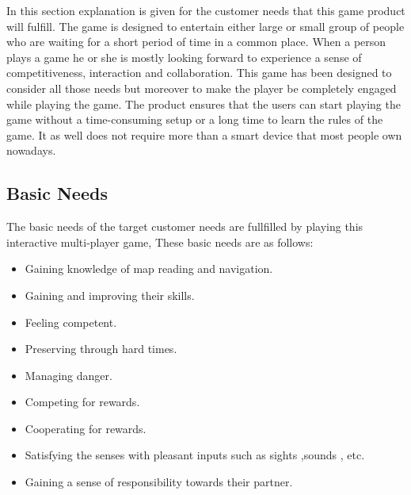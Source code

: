 

In this section explanation is given for the customer needs that this game product will fulfill. The game is designed to entertain either large or small group of people who are waiting for a short period of time in a common place. When a person plays a game he or she is mostly looking forward to experience a sense of competitiveness, interaction and collaboration. This game has been designed to consider all those needs but moreover to make the player be completely engaged while playing the game. The product ensures that the users can start playing the game without a time-consuming setup or a long time to learn the rules of the game. It as well does not require more than a smart device that most people own nowadays. 
 \subsection{Basic Needs}

 The basic needs of the target customer needs are fullfilled by playing this interactive multi-player game, These basic needs are as follows:
 \begin{itemize}
   	\item Gaining knowledge of map reading and navigation.
   	\item Gaining and improving their skills.
   	\item Feeling competent.
   	\item Preserving through hard times.
   	\item Managing danger.
   	\item Competing for rewards.
   	\item Cooperating for rewards.
   	\item Satisfying the senses with pleasant inputs such as sights ,sounds , etc.
   	\item Gaining a sense of responsibility towards their partner.
\end{itemize}  


     